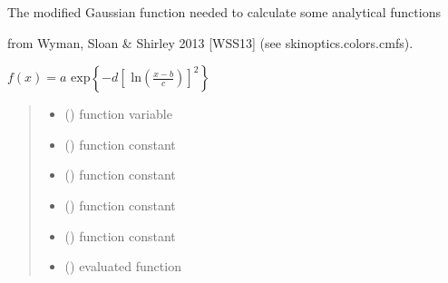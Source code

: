 \documentclass[letterpaper,10pt,english]{sphinxmanual}
\begin{document}
\begin{fulllineitems}
\label{\detokenize{01_utils:skinoptics.utils.mod_gaussian_Wyman}}
\pysigstartsignatures
{}
\pysigstopsignatures
\begin{DUlineblock}{0em}
\item[] The modified Gaussian function needed to calculate some analytical functions 
\item[] from Wyman, Sloan \& Shirley 2013 {[}WSS13{]} (see skinoptics.colors.cmfs).
\end{DUlineblock}

\sphinxAtStartPar
\(f(x) = a \mbox{ exp}\left\{-d \left[\mbox{ ln}\left(\frac{x - b}{c}\right)\right]^2\right\}\)
\begin{quote}\begin{description}
\begin{itemize}
\item {} 
\sphinxAtStartPar
{} () \textendash{} function variable

\item {} 
\sphinxAtStartPar
{} () \textendash{} function constant

\item {} 
\sphinxAtStartPar
{} () \textendash{} function constant

\item {} 
\sphinxAtStartPar
{} () \textendash{} function constant

\item {} 
\sphinxAtStartPar
{} () \textendash{} function constant

\end{itemize}

\sphinxAtStartPar
\begin{itemize}
\item {} 
\sphinxAtStartPar
{} () \textendash{} evaluated function

\end{itemize}


\end{description}\end{quote}

\end{fulllineitems}
\end{document}
